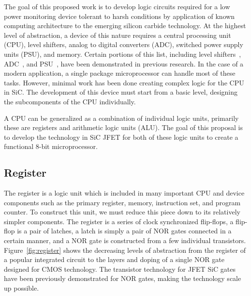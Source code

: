 \documentclass[12pt]{amsart}
\begin{document}
 	The goal of this proposed work is to develop logic circuits required for a low power monitoring device tolerant to harsh conditions by application of known computing architecture to the emerging silicon carbide technology.  At the highest level of abstraction, a device of this nature requires a central processing unit (CPU), level shifters, analog to digital converters (ADC), switched power supply units (PSU), and memory.  Certain portions of this list, including level shifters~\cite{krasowski_n_2010}, ADC~\cite{hedayati2016500}, and PSU~\cite{kargarrazi_500_2015}, have been demonstrated in previous research. In the case of a modern application, a single package microprocessor can handle most of these tasks.  However, minimal work has been done creating complex logic for the CPU in SiC.  The development of this device must start from a basic level, designing the subcomponents of the CPU individually.  
 	
 	A CPU can be generalized as a combination of individual logic units, primarily these are registers and arithmetic logic units (ALU).  The goal of this proposal is to develop the technology in SiC JFET for both of these logic units to create a functional 8-bit microprocessor.  
 	
 	\subsection{Register}
 	
 	The register is a logic unit which is included in many important CPU and device components such as the primary register, memory, instruction set, and program counter.  To construct this unit, we must reduce this piece down to its relatively simpler components.  The register is a series of clock synchronized flip-flops, a flip-flop is a pair of latches, a latch is simply a pair of NOR gates connected in a certain manner, and a NOR gate is constructed from a few individual transistors.  Figure~\ref{fig:register} shows the decreasing levels of abstraction from the register of a popular integrated circuit to the layers and doping of a single NOR gate designed for CMOS technology.  The transistor technology for JFET SiC gates have been previously demonstrated for NOR gates, making the technology scale up possible. 
 	
\end{document}
